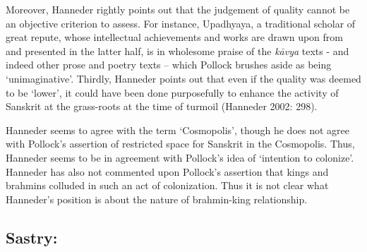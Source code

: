 Moreover, Hanneder rightly points out that the judgement of quality cannot be an objective criterion to assess. For instance, Upadhyaya, a traditional scholar of great repute, whose intellectual achievements and works are drawn upon from and presented in the latter half, is in wholesome praise of the \textit{kāvya} texts - and indeed other prose and poetry texts – which Pollock brushes aside as being ‘unimaginative’. Thirdly, Hanneder points out that even if the quality was deemed to be ‘lower’, it could have been done purposefully to enhance the activity of Sanskrit at the grass-roots at the time of turmoil (Hanneder 2002: 298).

Hanneder seems to agree with the term ‘Cosmopolis’, though he does not agree with Pollock’s assertion of restricted space for Sanskrit in the Cosmopolis. Thus, Hanneder seems to be in agreement with Pollock’s idea of ‘intention to colonize’. Hanneder has also not commented upon Pollock’s assertion that kings and brahmins colluded in such an act of colonization. Thus it is not clear what Hanneder’s position is about the nature of brahmin-king relationship.

\newpage

\subsection*{Sastry:}

\vspace{-.3cm}

